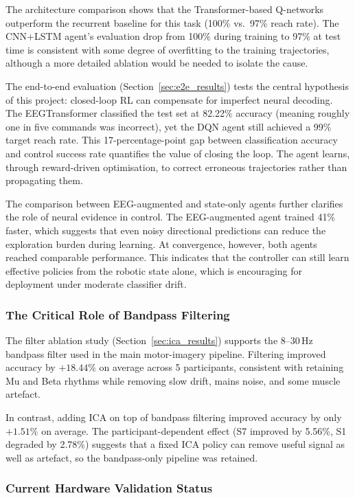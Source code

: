 \documentclass[12pt, a4paper]{article}
\begin{document}
The architecture comparison shows that the Transformer-based Q-networks outperform the recurrent baseline for this task (100\% vs.~97\% reach rate). The CNN+LSTM agent's evaluation drop from 100\% during training to 97\% at test time is consistent with some degree of overfitting to the training trajectories, although a more detailed ablation would be needed to isolate the cause.

The end-to-end evaluation (Section~\ref{sec:e2e_results}) tests the central hypothesis of this project: closed-loop RL can compensate for imperfect neural decoding. The EEGTransformer classified the test set at 82.22\% accuracy (meaning roughly one in five commands was incorrect), yet the DQN agent still achieved a 99\% target reach rate. This 17-percentage-point gap between classification accuracy and control success rate quantifies the value of closing the loop. The agent learns, through reward-driven optimisation, to correct erroneous trajectories rather than propagating them.

The comparison between EEG-augmented and state-only agents further clarifies the role of neural evidence in control. The EEG-augmented agent trained 41\% faster, which suggests that even noisy directional predictions can reduce the exploration burden during learning. At convergence, however, both agents reached comparable performance. This indicates that the controller can still learn effective policies from the robotic state alone, which is encouraging for deployment under moderate classifier drift.

\subsubsection{The Critical Role of Bandpass Filtering}

The filter ablation study (Section~\ref{sec:ica_results}) supports the 8--30\,Hz bandpass filter used in the main motor-imagery pipeline. Filtering improved accuracy by $+18.44\%$ on average across 5 participants, consistent with retaining Mu and Beta rhythms while removing slow drift, mains noise, and some muscle artefact.

In contrast, adding ICA on top of bandpass filtering improved accuracy by only $+1.51\%$ on average. The participant-dependent effect (S7 improved by 5.56\%, S1 degraded by 2.78\%) suggests that a fixed ICA policy can remove useful signal as well as artefact, so the bandpass-only pipeline was retained.

\subsubsection{Current Hardware Validation Status}
\end{document}
